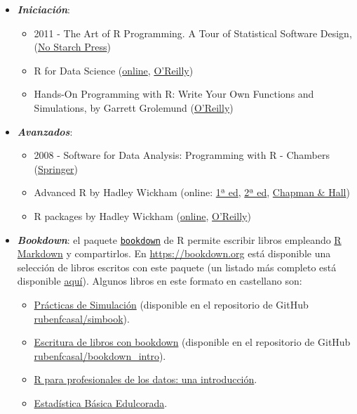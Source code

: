 \documentclass[
]{book}
\theoremstyle{break}
\theoremstyle{nonumberplain}
\begin{document}
\begin{itemize}
\item
  \textbf{\emph{Iniciación}}:

  \begin{itemize}
  \item
    2011 - The Art of R Programming. A Tour of Statistical Software Design,
    (\href{https://www.nostarch.com/artofr.htm}{No Starch Press})
  \item
    R for Data Science
    (\href{http://r4ds.had.co.nz/}{online}, \href{http://shop.oreilly.com/product/0636920034407.do}{O'Reilly})
  \item
    Hands-On Programming with R: Write Your Own Functions and Simulations,
    by Garrett Grolemund
    (\href{http://shop.oreilly.com/product/0636920028574.do}{O'Reilly})
  \end{itemize}
\item
  \textbf{\emph{Avanzados}}:

  \begin{itemize}
  \item
    2008 - Software for Data Analysis: Programming with R - Chambers
    (\href{http://www.springer.com/la/book/9780387759357}{Springer})
  \item
    Advanced R by Hadley Wickham
    (online: \href{http://adv-r.had.co.nz/}{1ª ed},
    \href{https://adv-r.hadley.nz/}{2ª ed},
    \href{https://www.amazon.com/dp/1466586966}{Chapman \& Hall})
  \item
    R packages by Hadley Wickham
    (\href{http://r-pkgs.had.co.nz/}{online},
    \href{http://shop.oreilly.com/product/0636920034421.do}{O'Reilly})
  \end{itemize}
\item
  \textbf{\emph{Bookdown}}:
  el paquete \href{https://bookdown.org}{\texttt{bookdown}} de R permite escribir libros empleando
  \href{http://rmarkdown.rstudio.com}{R Markdown} y compartirlos.
  En \url{https://bookdown.org} está disponible una selección de libros escritos con este paquete
  (un listado más completo está disponible \href{https://bookdown.org/home/archive/}{aquí}).
  Algunos libros en este formato en castellano son:

  \begin{itemize}
  \item
    \href{https://rubenfcasal.github.io/simbook}{Prácticas de Simulación}
    (disponible en el repositorio de GitHub
    \href{https://github.com/rubenfcasal/simbook}{rubenfcasal/simbook}).
  \item
    \href{https://rubenfcasal.github.io/bookdown_intro/}{Escritura de libros con bookdown}
    (disponible en el repositorio de GitHub
    \href{https://github.com/rubenfcasal/bookdown_intro}{rubenfcasal/bookdown\_intro}).
  \item
    \href{https://www.datanalytics.com/libro_r/index.html}{R para profesionales de los datos: una introducción}.
  \item
    \href{https://bookdown.org/aquintela/EBE}{Estadística Básica Edulcorada}.
  \end{itemize}
\end{itemize}
\end{document}

